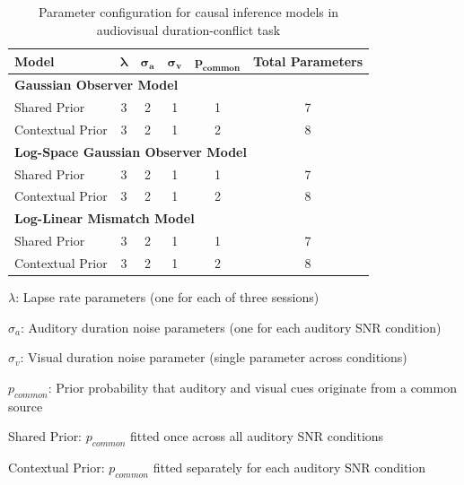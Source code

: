 \begin{table}[htbp]
\centering
\caption{Parameter configuration for causal inference models in audiovisual duration-conflict task}
\label{tab:model_parameters}
\begin{tabular}{lccccc}
\toprule
\textbf{Model} & \textbf{$\boldsymbol{\lambda}$} & \textbf{$\boldsymbol{\sigma_a}$} & \textbf{$\boldsymbol{\sigma_v}$} & \textbf{$\boldsymbol{p_{common}}$} & \textbf{Total Parameters} \\
\midrule
\multicolumn{6}{l}{\textbf{Gaussian Observer Model}} \\
\quad Shared Prior & 3 & 2 & 1 & 1 & 7 \\
\quad Contextual Prior & 3 & 2 & 1 & 2 & 8 \\
\midrule
\multicolumn{6}{l}{\textbf{Log-Space Gaussian Observer Model}} \\
\quad Shared Prior & 3 & 2 & 1 & 1 & 7 \\
\quad Contextual Prior & 3 & 2 & 1 & 2 & 8 \\
\midrule
\multicolumn{6}{l}{\textbf{Log-Linear Mismatch Model}} \\
\quad Shared Prior & 3 & 2 & 1 & 1 & 7 \\
\quad Contextual Prior & 3 & 2 & 1 & 2 & 8 \\
\bottomrule
\end{tabular}
\begin{tablenotes}
\small
\item $\lambda$: Lapse rate parameters (one for each of three sessions)
\item $\sigma_a$: Auditory duration noise parameters (one for each auditory SNR condition)
\item $\sigma_v$: Visual duration noise parameter (single parameter across conditions)
\item $p_{common}$: Prior probability that auditory and visual cues originate from a common source
\item Shared Prior: $p_{common}$ fitted once across all auditory SNR conditions
\item Contextual Prior: $p_{common}$ fitted separately for each auditory SNR condition
\end{tablenotes}
\end{table}